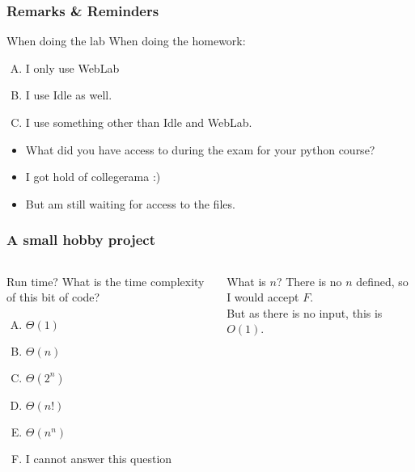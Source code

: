 

\begin{frame}
	\frametitle{Remarks \& Reminders}
	\begin{questionblock}{When doing the lab}
		When doing the homework:
		\begin{enumerate}[A.]
			\item I only use WebLab
			\item I use Idle as well.
			\item I use something other than Idle and WebLab.
		\end{enumerate}
	\end{questionblock}
	\pause
	\begin{itemize}
		\item What did you have access to during the exam for your python course?
			\pause
		\item I got hold of collegerama :)
		\item But am still waiting for access to the files.
	\end{itemize}
\end{frame}


\begin{frame}
	\frametitle{A small hobby project}
	
	\pause
		\vspace{-0.4cm}
	\begin{columns}
	\begin{questionblock}{Run time?}
		What is the time complexity of this bit of code?
		\vspace{-0.5cm}
		\begin{multicols}{2}
			\begin{enumerate}[A.]
				\item $\Theta(1)$
				\item $\Theta(n)$
				\item $\Theta(2^n)$
				\item $\Theta(n!)$
				\item $\Theta(n^n)$
				\item I cannot answer this question
			\end{enumerate}
		\end{multicols}
	\end{questionblock}
	\pause
		\begin{answerblock}{What is $n$?}
			There is no $n$ defined, so I would accept $F$.\\
			But as there is no input, this is $O(1)$.
		\end{answerblock}
	\end{columns}
\end{frame}


